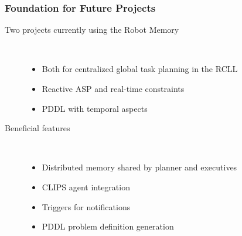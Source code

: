 \begin{frame}
  \frametitle{Foundation for Future Projects}
  \begin{description}
  \item[Two projects currently using the Robot Memory]\hfill\\
    \begin{itemize}
    \item Both for centralized global task planning in the RCLL
    \item Reactive ASP and real-time constraints
    \item PDDL with temporal aspects
    \end{itemize}
  \item[Beneficial features] \hfill \\
    \begin{itemize}
    \item Distributed memory shared by planner and executives
    \item CLIPS agent integration
    \item Triggers for notifications
    \item PDDL problem definition generation
    \end{itemize}
  \end{description}
\end{frame}

